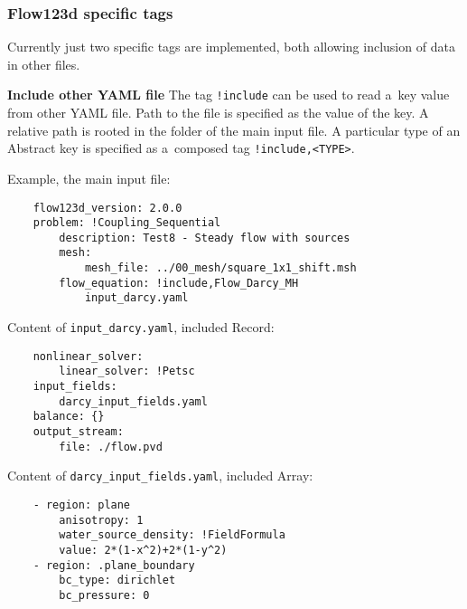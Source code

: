 \subsubsection{Flow123d specific tags}
\label{sec:spec_tags}
Currently just two specific tags are implemented, both allowing inclusion of data in other files.

{\bf Include other YAML file} The tag \verb'!include' can be used to read a~key value from other YAML file.
Path to the file is specified as the value of the key. A relative path is rooted in the folder of the main input file.
A particular type of an Abstract key is specified as a~composed tag \verb'!include,<TYPE>'.

Example, the main input file:
\begin{verbatim}
    flow123d_version: 2.0.0
    problem: !Coupling_Sequential
        description: Test8 - Steady flow with sources
        mesh:
            mesh_file: ../00_mesh/square_1x1_shift.msh
        flow_equation: !include,Flow_Darcy_MH
            input_darcy.yaml
\end{verbatim}
Content of \verb'input_darcy.yaml', included Record:
\begin{verbatim}
    nonlinear_solver:
        linear_solver: !Petsc
    input_fields:
        darcy_input_fields.yaml
    balance: {}
    output_stream: 
        file: ./flow.pvd
\end{verbatim}
Content of \verb'darcy_input_fields.yaml', included Array:
\begin{verbatim}
    - region: plane
        anisotropy: 1
        water_source_density: !FieldFormula
        value: 2*(1-x^2)+2*(1-y^2)
    - region: .plane_boundary
        bc_type: dirichlet
        bc_pressure: 0    
\end{verbatim}

